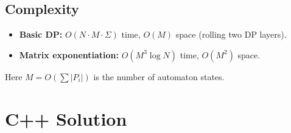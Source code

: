 \documentclass[11pt,a4paper]{article}
\begin{document}
\subsection{Complexity}
\begin{itemize}
    \item \textbf{Basic DP:} $O(N \cdot M \cdot \Sigma)$ time, $O(M)$ space (rolling two DP layers).
    \item \textbf{Matrix exponentiation:} $O(M^3 \log N)$ time, $O(M^2)$ space.
\end{itemize}
Here $M = O(\sum |P_i|)$ is the number of automaton states.

\section{C++ Solution}
\end{document}

